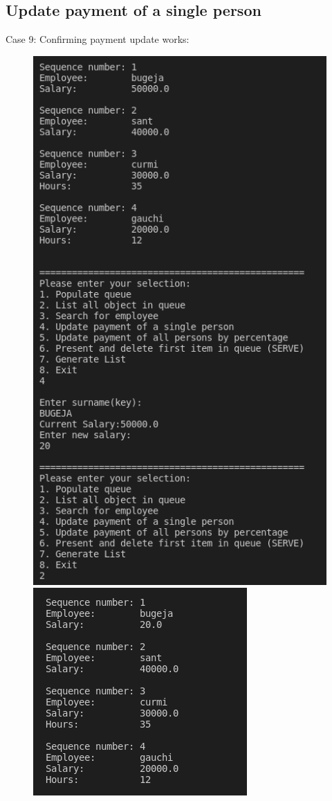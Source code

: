 \documentclass[12pt]{article}
\begin{document}
\subsection{Update payment of a single person}
Case 9: Confirming payment update works:
\begin{figure}[h]
\centering
\includegraphics[scale=0.30]{Images/Testing 4/1_1.png}
\includegraphics[scale=0.30]{Images/Testing 4/1_2.png}
\end{figure}
\end{document}
